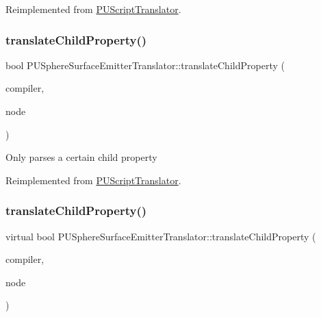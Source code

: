 Reimplemented from \hyperlink{classPUScriptTranslator_ab587d01348ae3e678cb700c719b2b113}{P\+U\+Script\+Translator}.

\mbox{\label{classPUSphereSurfaceEmitterTranslator_a717483be8f21b0abc4c0a320371251bc}} 
\subsubsection{\texorpdfstring{translate\+Child\+Property()}{translateChildProperty()}\hspace{0.1cm}{\footnotesize\ttfamily [1/2]}}
{\footnotesize\ttfamily bool P\+U\+Sphere\+Surface\+Emitter\+Translator\+::translate\+Child\+Property (\begin{DoxyParamCaption}\item[{\hyperlink{classPUScriptCompiler}{P\+U\+Script\+Compiler} $\ast$}]{compiler,  }\item[{\hyperlink{classPUAbstractNode}{P\+U\+Abstract\+Node} $\ast$}]{node }\end{DoxyParamCaption})\hspace{0.3cm}{\ttfamily [virtual]}}

Only parses a certain child property 

Reimplemented from \hyperlink{classPUScriptTranslator_a0374d83a8a04e57918975d525e0f8fe8}{P\+U\+Script\+Translator}.

\mbox{\label{classPUSphereSurfaceEmitterTranslator_a4bb2bb02a46841a9b12291eaa50e8ffb}} 
\subsubsection{\texorpdfstring{translate\+Child\+Property()}{translateChildProperty()}\hspace{0.1cm}{\footnotesize\ttfamily [2/2]}}
{\footnotesize\ttfamily virtual bool P\+U\+Sphere\+Surface\+Emitter\+Translator\+::translate\+Child\+Property (\begin{DoxyParamCaption}\item[{\hyperlink{classPUScriptCompiler}{P\+U\+Script\+Compiler} $\ast$}]{compiler,  }\item[{\hyperlink{classPUAbstractNode}{P\+U\+Abstract\+Node} $\ast$}]{node }\end{DoxyParamCaption})\hspace{0.3cm}{\ttfamily [virtual]}}

